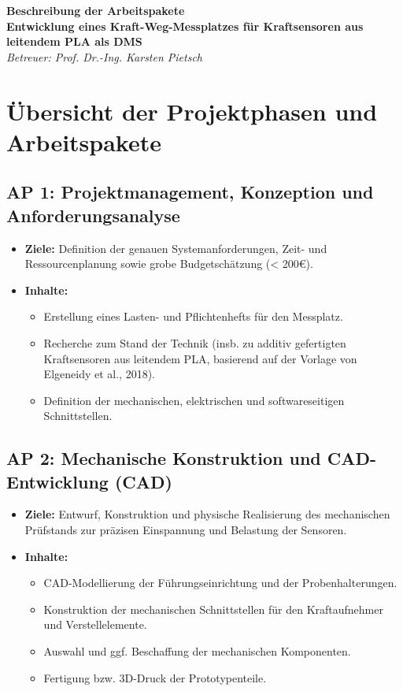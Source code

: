 \documentclass[11pt, a4paper]{article}
\begin{document}
\begin{center}
    {\LARGE \textbf{Beschreibung der Arbeitspakete}}\\[6pt]
    {\large \textbf{Entwicklung eines Kraft-Weg-Messplatzes für Kraftsensoren aus leitendem PLA als DMS}}\\[4pt]
    \normalsize \textit{Betreuer: Prof. Dr.-Ing. Karsten Pietsch}
\end{center}

\vspace{0.5em}

\section*{Übersicht der Projektphasen und Arbeitspakete}

\subsection*{AP 1: Projektmanagement, Konzeption und Anforderungsanalyse}
\begin{itemize}[leftmargin=*, label=$\bullet$]
    \item \textbf{Ziele:} Definition der genauen Systemanforderungen, Zeit- und Ressourcenplanung sowie grobe Budgetschätzung (< 200€).
    \item \textbf{Inhalte:}
    \begin{itemize}[leftmargin=*]
        \item Erstellung eines Lasten- und Pflichtenhefts für den Messplatz.
        \item Recherche zum Stand der Technik (insb. zu additiv gefertigten Kraftsensoren aus leitendem PLA, basierend auf der Vorlage von Elgeneidy et al., 2018).
        \item Definition der mechanischen, elektrischen und softwareseitigen Schnittstellen.
    \end{itemize}
\end{itemize}

\subsection*{AP 2: Mechanische Konstruktion und CAD-Entwicklung (CAD)}
\begin{itemize}[leftmargin=*, label=$\bullet$]
    \item \textbf{Ziele:} Entwurf, Konstruktion und physische Realisierung des mechanischen Prüfstands zur präzisen Einspannung und Belastung der Sensoren.
    \item \textbf{Inhalte:}
    \begin{itemize}[leftmargin=*]
        \item CAD-Modellierung der Führungseinrichtung und der Probenhalterungen.
        \item Konstruktion der mechanischen Schnittstellen für den Kraftaufnehmer und Verstellelemente.
        \item Auswahl und ggf. Beschaffung der mechanischen Komponenten.
        \item Fertigung bzw. 3D-Druck der Prototypenteile.
    \end{itemize}
\end{itemize}
\end{document}

